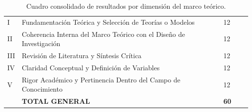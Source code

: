 \begin{table}[htbp]
\centering
\scriptsize
\caption{Cuadro consolidado de resultados por dimensión del marco teórico.}\label{tab:consolidado-marco-teorico}
\begin{tabularx}{\textwidth}{|C{0.8cm}|L{7.5cm}|C{1.8cm}|C{1.8cm}|X|}
\hline
{}
 &  &  &  &  \\ \hline
I & Fundamentación Teórica y Selección de Teorías o Modelos & 12 & & \\ \hline
{}
II & Coherencia Interna del Marco Teórico con el Diseño de Investigación & 12 & & \\ \hline
III & Revisión de Literatura y Síntesis Crítica & 12 & & \\ \hline
{}
IV & Claridad Conceptual y Definición de Variables & 12 & & \\ \hline
V & Rigor Académico y Pertinencia Dentro del Campo de Conocimiento & 12 & & \\ \hline
{}
& \textbf{TOTAL GENERAL} & \textbf{60} & & \\ \hline
\end{tabularx}
\normalsize
\end{table}
